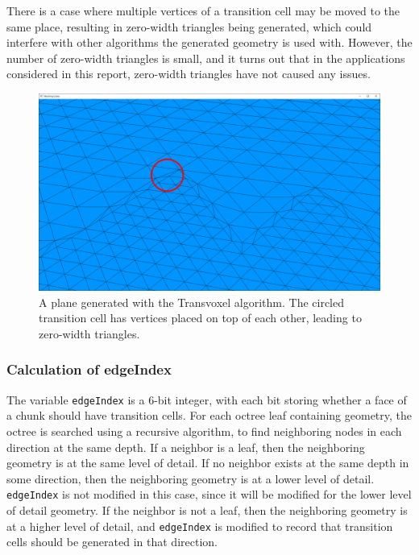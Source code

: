 \documentclass[11pt]{article}
\begin{document}
\begin{enumerate}
There is a case where multiple vertices of a transition cell may be moved to the same place, resulting in zero-width triangles being generated, which could interfere with other algorithms the generated geometry is used with. However, the number of zero-width triangles is small, and it turns out that in the applications considered in this report, zero-width triangles have not caused any issues.

\begin{figure}[H]
  \includegraphics[width=\textwidth]{tv_transition_plane}
  \caption{A plane generated with the Transvoxel algorithm. The circled transition cell has vertices placed on top of each other, leading to zero-width triangles.}
  \label{fig:tv_transition_plane}
\end{figure}

\end{enumerate}

\subsubsection{Calculation of edgeIndex}
\label{section:edgeIndex}

The variable \texttt{edgeIndex} is a 6-bit integer, with each bit storing whether a face of a chunk should have transition cells. For each octree leaf containing geometry, the octree is searched using a recursive algorithm, to find neighboring nodes in each direction at the same depth. If a neighbor is a leaf, then the neighboring geometry is at the same level of detail. If no neighbor exists at the same depth in some direction, then the neighboring geometry is at a lower level of detail. \texttt{edgeIndex} is not modified in this case, since it will be modified for the lower level of detail geometry. If the neighbor is not a leaf, then the neighboring geometry is at a higher level of detail, and \texttt{edgeIndex} is modified to record that transition cells should be generated in that direction.
\end{document}
